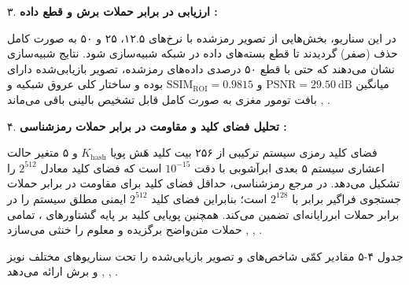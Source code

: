 

۳. \textbf{ارزیابی در برابر حملات برش و قطع داده :}\par

در این سناریو، بخش‌هایی از تصویر رمزشده با نرخ‌های ۱۲.۵، ۲۵ و ۵۰ به صورت کامل حذف (صفر) گردیدند تا قطع بسته‌های داده در شبکه  شبیه‌سازی شود. نتایج شبیه‌سازی نشان می‌دهند که حتی با قطع ۵۰ درصدی داده‌های رمزشده، تصویر بازیابی‌شده دارای میانگین $\mathrm{PSNR} = 29.50\mathrm{\ dB}$ و $\mathrm{SSIM}_{\mathrm{ROI}} = 0.9815$ بوده و ساختار کلی عروق شبکیه و بافت تومور مغزی به صورت کامل قابل تشخیص بالینی باقی می‌ماند , .\par



۴. \textbf{تحلیل فضای کلید و مقاومت در برابر حملات رمزشناسی :}\par

فضای کلید رمزی سیستم ترکیبی از ۲۵۶ بیت کلید هَش پویا $K_{\mathrm{hash}}$ و ۵ متغیر حالت اعشاری سیستم ۵ بعدی ابرآشوبی با دقت $10^{-15}$ است که فضای کلید معادل $2^{512}$ را تشکیل می‌دهد. در مرجع رمزشناسی، حداقل فضای کلید برای مقاومت در برابر حملات جستجوی فراگیر  برابر با $2^{128}$ است؛ بنابراین فضای کلید $2^{512}$ ایمنی مطلق سیستم را در برابر حملات ابررایانه‌ای تضمین می‌کند. همچنین پویایی کلید بر پایه گشتاورهای ، تمامی حملات متن‌واضح برگزیده  و معلوم  را خنثی می‌سازد , , .\par



جدول ۴{-}۵ مقادیر کمّی شاخص‌های  و  تصویر بازیابی‌شده را تحت سناریوهای مختلف نویز و برش ارائه می‌دهد , , .\par




